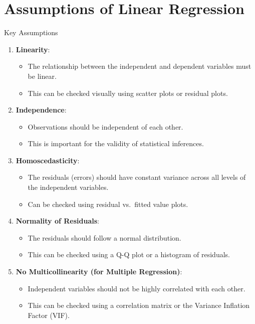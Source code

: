 \documentclass[
  18 pt,
  ignorenonframetext,
  aspectratio=1610,
]{beamer}
\providecommand{\tightlist}{%
  \setlength{\itemsep}{0pt}\setlength{\parskip}{0pt}}\usepackage{longtable,booktabs,array}
\begin{document}
\hypertarget{assumptions-of-linear-regression}{%
\section{Assumptions of Linear
Regression}\label{assumptions-of-linear-regression}}

\begin{frame}{Key Assumptions}
\protect\hypertarget{key-assumptions}{}
\begin{enumerate}
\tightlist
\item
  \textbf{Linearity}:

  \begin{itemize}
  \tightlist
  \item
    The relationship between the independent and dependent variables
    must be linear.
  \item
    This can be checked visually using scatter plots or residual plots.
  \end{itemize}
\item
  \textbf{Independence}:

  \begin{itemize}
  \tightlist
  \item
    Observations should be independent of each other.
  \item
    This is important for the validity of statistical inferences.
  \end{itemize}
\item
  \textbf{Homoscedasticity}:

  \begin{itemize}
  \tightlist
  \item
    The residuals (errors) should have constant variance across all
    levels of the independent variables.
  \item
    Can be checked using residual vs.~fitted value plots.
  \end{itemize}
\item
  \textbf{Normality of Residuals}:

  \begin{itemize}
  \tightlist
  \item
    The residuals should follow a normal distribution.
  \item
    This can be checked using a Q-Q plot or a histogram of residuals.
  \end{itemize}
\item
  \textbf{No Multicollinearity (for Multiple Regression)}:

  \begin{itemize}
  \tightlist
  \item
    Independent variables should not be highly correlated with each
    other.
  \item
    This can be checked using a correlation matrix or the Variance
    Inflation Factor (VIF).
  \end{itemize}
\end{enumerate}
\end{frame}
\end{document}
